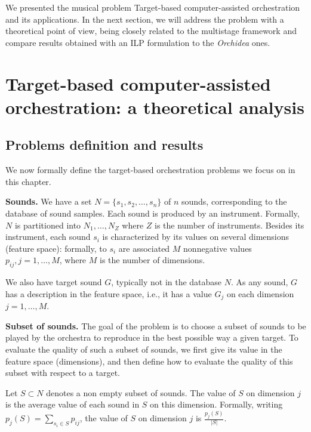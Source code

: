 \documentclass[a4paper]{book}
\begin{document}
We presented the musical problem {\sc Target-based computer-assisted orchestration} and its applications. In the next section, we will address the problem with a theoretical point of view, being closely related to the multistage framework and compare results obtained with an ILP formulation to the \textit{Orchidea} ones.

\section{Target-based computer-assisted orchestration: a theoretical analysis}


\subsection{Problems definition and results}\label{sec:def}


We now formally define the target-based orchestration problems we focus on in this chapter. 

{\bf Sounds.} We have a set $N=\{s_1,s_2,\dots,s_n\}$ of $n$ sounds, corresponding to the database of sound samples. Each sound is produced by  an instrument. Formally, $N$ is partitioned into $N_1,\dots,N_Z$ where $Z$ is the number of instruments. Besides its instrument, each sound $s_i$ is characterized by its values on several dimensions (feature space): formally, to $s_i$ are associated $M$ nonnegative values $p_{ij},j=1,\dots,M$, where $M$ is the number of dimensions.

We also have  target sound $G$, typically not in the database $N$. As any sound, $G$ has a description in the feature space, i.e., it has a value $G_j$ on each dimension $j=1,\dots,M$.

{\bf Subset of sounds.} The goal of the problem is to choose a subset of sounds to be played by the orchestra to reproduce in the best possible way a given target. To evaluate the quality of such a subset of sounds, we first give its value in the feature space (dimensions), and then define how to evaluate the quality of this subset with respect to a target. 

Let $S\subset N$ denotes a non empty subset of sounds. The value of $S$ on dimension $j$ is the average value of each sound in $S$ on this dimension. Formally, writing $p_j(S)=\sum_{s_i\in S}p_{ij}$, the value of $S$ on dimension $j$ is $\frac{p_j(S)}{|S|}$. 
\end{document}
